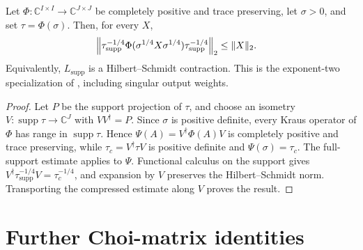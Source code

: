 \begin{theorem}
    \label{thm:weighted_hilbert_schmidt_contraction_support}
    \leanok
    Let $\Phi:\mathbb C^{I\times I}\to\mathbb C^{J\times J}$ be completely
    positive and trace preserving, let $\sigma>0$, and set
    $\tau=\Phi(\sigma)$.  Then, for every $X$,
    \begin{align}
        \left\|\tau^{-1/4}_{\operatorname{supp}}
          \Phi(\sigma^{1/4}X\sigma^{1/4})
          \tau^{-1/4}_{\operatorname{supp}}\right\|_2
        &\leq \|X\|_2.
        \notag
    \end{align}
    Equivalently, $L_{\operatorname{supp}}$ is a Hilbert--Schmidt
    contraction.  This is the exponent-two specialization of
    \cite[Theorem~6, Equation~(18)]{Beigi2013Sandwiched}, including singular
    output weights.
\end{theorem}

\begin{proof}
    \leanok
    Let $P$ be the support projection of $\tau$, and choose an isometry
    $V:\operatorname{supp}\tau\to\mathbb C^J$ with $VV^\dagger=P$.  Since
    $\sigma$ is positive definite, every Kraus operator of $\Phi$ has range
    in $\operatorname{supp}\tau$.  Hence
    $\Psi(A)=V^\dagger\Phi(A)V$ is completely positive and trace preserving,
    while $\tau_c=V^\dagger\tau V$ is positive definite and
    $\Psi(\sigma)=\tau_c$.  The full-support estimate applies to $\Psi$.
    Functional calculus on the support gives
    $V^\dagger\tau^{-1/4}_{\operatorname{supp}}V=\tau_c^{-1/4}$, and
    expansion by $V$ preserves the Hilbert--Schmidt norm.  Transporting the
    compressed estimate along $V$ proves the result.
\end{proof}

\section{Further Choi-matrix identities}
\label{sec:choi_matrix_further_identities}

